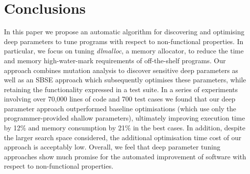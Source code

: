 \section{Conclusions}

In this paper we propose an automatic algorithm for discovering and
optimising deep parameters to tune programs with respect to non-functional
properties.  In particular, we focus on tuning \emph{dlmalloc}, a memory
allocator, to reduce the time and memory high-water-mark requirements of
off-the-shelf programs. Our approach combines mutation analysis to
discover sensitive deep parameters as well as an SBSE approach which 
subsequently optimises these parameters, while retaining the functionality expressed in
a test suite.  In a series of experiments involving over 70,000 lines of
code and 700 test cases we found that our deep parameter approach
outperformed baseline optimisations (which use only the programmer-provided
shallow parameters), ultimately improving execution time by 12\% 
and memory consumption by 21\% in the best cases. In addition, despite
the larger search space considered, the additional optimisation time cost
of our approach is acceptably low. Overall, we feel that deep parameter tuning 
approaches show much promise for the automated improvement of software
with respect to non-functional properties.  



\vspace{-2mm}